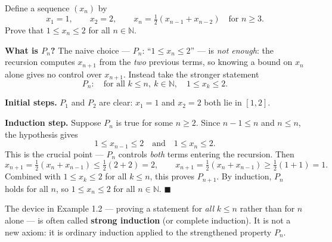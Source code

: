 \documentclass[11pt]{report}
\begin{document}
\begin{exbox}
Define a sequence $(x_n)$ by
\[
x_1 = 1, \qquad x_2 = 2, \qquad x_n = \tfrac{1}{2}(x_{n-1} + x_{n-2}) \quad \text{for } n \geq 3.
\]
Prove that $1 \leq x_n \leq 2$ for all $n \in \mathbb{N}$.

\textbf{What is $P_n$?} The naive choice --- $P_n$: ``$1 \leq x_n \leq 2$'' --- is \emph{not enough}: the recursion computes $x_{n+1}$ from the \emph{two} previous terms, so knowing a bound on $x_n$ alone gives no control over $x_{n+1}$. Instead take the stronger statement
\[
P_n: \quad \text{for all } k \leq n,\ k \in \mathbb{N}, \quad 1 \leq x_k \leq 2.
\]

\textbf{Initial steps.} $P_1$ and $P_2$ are clear: $x_1 = 1$ and $x_2 = 2$ both lie in $[1,2]$.

\textbf{Induction step.} Suppose $P_n$ is true for some $n \geq 2$. Since $n-1 \leq n$ and $n \leq n$, the hypothesis gives
\[
1 \leq x_{n-1} \leq 2 \quad \text{and} \quad 1 \leq x_n \leq 2.
\]
This is the crucial point --- $P_n$ controls \emph{both} terms entering the recursion. Then
\[
x_{n+1} = \tfrac{1}{2}(x_n + x_{n-1}) \leq \tfrac{1}{2}(2 + 2) = 2,
\qquad
x_{n+1} = \tfrac{1}{2}(x_n + x_{n-1}) \geq \tfrac{1}{2}(1 + 1) = 1.
\]
Combined with $1 \leq x_k \leq 2$ for all $k \leq n$, this proves $P_{n+1}$. By induction, $P_n$ holds for all $n$, so $1 \leq x_n \leq 2$ for all $n \in \mathbb{N}$. \hfill $\blacksquare$
\end{exbox}

\begin{rembox}
The device in Example 1.2 --- proving a statement for \emph{all} $k \leq n$ rather than for $n$ alone --- is often called \textbf{strong induction} (or complete induction). It is not a new axiom: it is ordinary induction applied to the strengthened property $P_n$.
\end{rembox}
\end{document}
